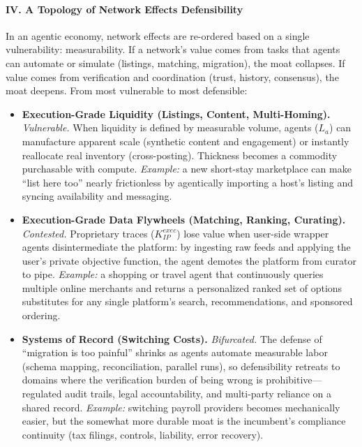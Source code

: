 \documentclass[12pt, letter]{article}
\begin{document}
\paragraph{IV. A Topology of Network Effects Defensibility}

In an agentic economy, network effects are re-ordered based on a single vulnerability: measurability. If a network’s value comes from tasks that agents can automate or simulate (listings, matching, migration), the moat collapses. If value comes from verification and coordination (trust, history, consensus), the moat deepens. From most vulnerable to most defensible:

\begin{itemize}
\item \textbf{Execution-Grade Liquidity (Listings, Content, Multi-Homing).} \textit{Vulnerable.}
When liquidity is defined by measurable volume, agents ($L_a$) can manufacture apparent scale (synthetic content and engagement) or instantly reallocate real inventory (cross-posting). Thickness becomes a commodity purchasable with compute. \textit{Example:} a new short-stay marketplace can make ``list here too'' nearly frictionless by agentically importing a host’s listing and syncing availability and messaging.

\item \textbf{Execution-Grade Data Flywheels (Matching, Ranking, Curating).} \textit{Contested.}
Proprietary traces ($K_{IP}^{exec}$) lose value when user-side wrapper agents disintermediate the platform: by ingesting raw feeds and applying the user’s private objective function, the agent demotes the platform from curator to pipe. \textit{Example:} a shopping or travel agent that continuously queries multiple online merchants and returns a personalized ranked set of options substitutes for any single platform’s search, recommendations, and sponsored ordering.



\item \textbf{Systems of Record (Switching Costs).} \textit{Bifurcated.}
The defense of ``migration is too painful'' shrinks as agents automate measurable labor (schema mapping, reconciliation, parallel runs), so defensibility retreats to domains where the verification burden of being wrong is prohibitive---regulated audit trails, legal accountability, and multi-party reliance on a shared record. \textit{Example:} switching payroll providers becomes mechanically easier, but the somewhat more durable moat is the incumbent’s compliance continuity (tax filings, controls, liability, error recovery).


\end{itemize}
\end{document}
